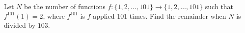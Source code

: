 Let $N$ be the number of functions $f:\{1,2,\dots,101\}\to\{1,2,\dots,101\}$ such that $f^{101}(1)=2$, where $f^{101}$ is $f$ applied $101$ times. Find the remainder when $N$ is divided by $103$.
